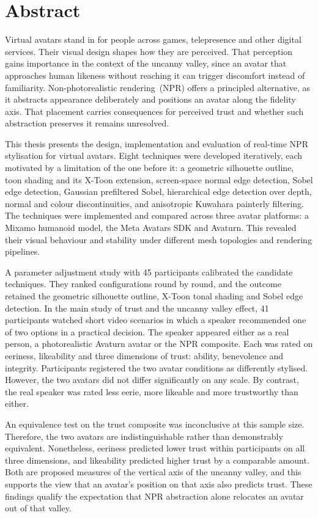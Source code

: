 \chapter*{Abstract}

Virtual avatars stand in for people across games, telepresence and other digital services. Their visual design shapes how they are perceived. That perception gains importance in the context of the uncanny valley, since an avatar that approaches human likeness without reaching it can trigger discomfort instead of familiarity. Non-photorealistic rendering~(NPR) offers a principled alternative, as it abstracts appearance deliberately and positions an avatar along the fidelity axis. That placement carries consequences for perceived trust and whether such abstraction preserves it remains unresolved.

This thesis presents the design, implementation and evaluation of real-time NPR stylisation for virtual avatars. Eight techniques were developed iteratively, each motivated by a limitation of the one before it: a geometric silhouette outline, toon shading and its X-Toon extension, screen-space normal edge detection, Sobel edge detection, Gaussian prefiltered Sobel, hierarchical edge detection over depth, normal and colour discontinuities, and anisotropic Kuwahara painterly filtering. The techniques were implemented and compared across three avatar platforms: a Mixamo humanoid model, the Meta Avatars SDK and Avaturn. This revealed their visual behaviour and stability under different mesh topologies and rendering pipelines.

A parameter adjustment study with 45 participants calibrated the candidate techniques. They ranked configurations round by round, and the outcome retained the geometric silhouette outline, X-Toon tonal shading and Sobel edge detection. In the main study of trust and the uncanny valley effect, 41 participants watched short video scenarios in which a speaker recommended one of two options in a practical decision. The speaker appeared either as a real person, a photorealistic Avaturn avatar or the NPR composite. Each was rated on eeriness, likeability and three dimensions of trust: ability, benevolence and integrity. Participants registered the two avatar conditions as differently stylised. However, the two avatars did not differ significantly on any scale. By contrast, the real speaker was rated less eerie, more likeable and more trustworthy than either.

An equivalence test on the trust composite was inconclusive at this sample size. Therefore, the two avatars are indistinguishable rather than demonstrably equivalent. Nonetheless, eeriness predicted lower trust within participants on all three dimensions, and likeability predicted higher trust by a comparable amount. Both are proposed measures of the vertical axis of the uncanny valley, and this supports the view that an avatar's position on that axis also predicts trust. These findings qualify the expectation that NPR abstraction alone relocates an avatar out of that valley.

\newpage
